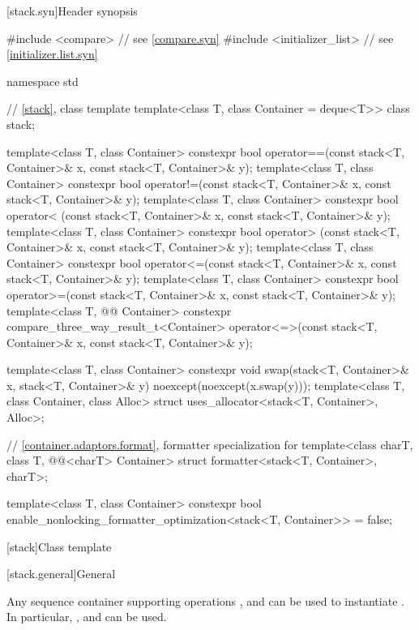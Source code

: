 [stack.syn]{Header  synopsis}

%
\begin{codeblock}
#include <compare>              // see \ref{compare.syn}
#include <initializer_list>     // see \ref{initializer.list.syn}

namespace std {
  // \ref{stack}, class template 
  template<class T, class Container = deque<T>> class stack;

  template<class T, class Container>
    constexpr bool operator==(const stack<T, Container>& x, const stack<T, Container>& y);
  template<class T, class Container>
    constexpr bool operator!=(const stack<T, Container>& x, const stack<T, Container>& y);
  template<class T, class Container>
    constexpr bool operator< (const stack<T, Container>& x, const stack<T, Container>& y);
  template<class T, class Container>
    constexpr bool operator> (const stack<T, Container>& x, const stack<T, Container>& y);
  template<class T, class Container>
    constexpr bool operator<=(const stack<T, Container>& x, const stack<T, Container>& y);
  template<class T, class Container>
    constexpr bool operator>=(const stack<T, Container>& x, const stack<T, Container>& y);
  template<class T, @@ Container>
    constexpr compare_three_way_result_t<Container>
      operator<=>(const stack<T, Container>& x, const stack<T, Container>& y);

  template<class T, class Container>
    constexpr void swap(stack<T, Container>& x, stack<T, Container>& y)
      noexcept(noexcept(x.swap(y)));
  template<class T, class Container, class Alloc>
    struct uses_allocator<stack<T, Container>, Alloc>;

  // \ref{container.adaptors.format}, formatter specialization for 
  template<class charT, class T, @@<charT> Container>
    struct formatter<stack<T, Container>, charT>;

  template<class T, class Container>
    constexpr bool enable_nonlocking_formatter_optimization<stack<T, Container>> = false;
}
\end{codeblock}

[stack]{Class template }

[stack.general]{General}

\pnum
{}%
Any sequence container supporting operations
,
and
can be used to instantiate
.
In particular,
,
and
can be used.

